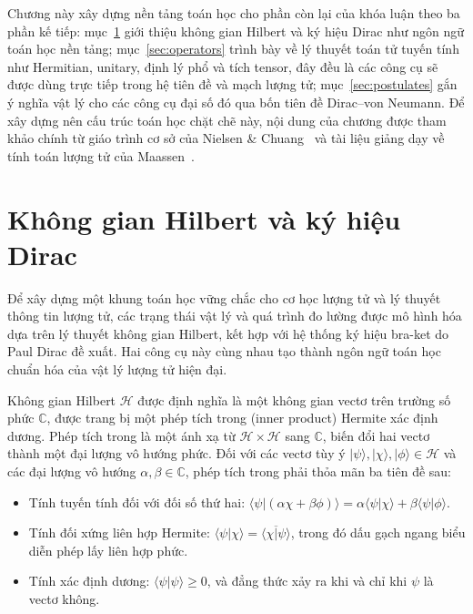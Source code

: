 Chương này xây dựng nền tảng toán học cho phần còn lại của khóa luận theo ba phần kế tiếp: mục~\ref{sec:hilbert} giới thiệu không gian Hilbert và ký hiệu Dirac như ngôn ngữ toán học nền tảng; mục~\ref{sec:operators} trình bày về lý thuyết toán tử tuyến tính như Hermitian, unitary, định lý phổ và tích tensor, đây đều là các công cụ sẽ được dùng trực tiếp trong hệ tiên đề và mạch lượng tử; mục~\ref{sec:postulates} gắn ý nghĩa vật lý cho các công cụ đại số đó qua bốn tiên đề Dirac--von Neumann. Để xây dựng nên cấu trúc toán học chặt chẽ này, nội dung của chương được tham khảo chính từ giáo trình cơ sở của Nielsen \& Chuang~\cite{ref5} và tài liệu giảng dạy về tính toán lượng tử của Maassen~\cite{ref4}.

\section{Không gian Hilbert và ký hiệu Dirac}
\label{sec:hilbert}
Để xây dựng một khung toán học vững chắc cho cơ học lượng tử và lý thuyết thông tin lượng tử, các trạng thái vật lý và quá trình đo lường được mô hình hóa dựa trên lý thuyết không gian Hilbert, kết hợp với hệ thống ký hiệu bra-ket do Paul Dirac đề xuất. Hai công cụ này cùng nhau tạo thành ngôn ngữ toán học chuẩn hóa của vật lý lượng tử hiện đại.

\begin{definition} 
Không gian Hilbert $\mathcal{H}$ được định nghĩa là một không gian vectơ trên trường số phức $\mathbb{C}$, được trang bị một phép tích trong (inner product) Hermite xác định dương. Phép tích trong là một ánh xạ từ $\mathcal{H} \times \mathcal{H}$ sang $\mathbb{C}$, biến đổi hai vectơ thành một đại lượng vô hướng phức. Đối với các vectơ tùy ý $|\psi\rangle, |\chi\rangle, |\phi\rangle \in \mathcal{H}$ và các đại lượng vô hướng $\alpha, \beta \in \mathbb{C}$, phép tích trong phải thỏa mãn ba tiên đề sau:
\begin{itemize}
    \item Tính tuyến tính đối với đối số thứ hai: $\langle \psi | (\alpha \chi + \beta \phi) \rangle = \alpha \langle \psi | \chi \rangle + \beta \langle \psi | \phi \rangle$.
    \item Tính đối xứng liên hợp Hermite: $\langle \psi | \chi \rangle = \overline{\langle \chi | \psi \rangle}$, trong đó dấu gạch ngang biểu diễn phép lấy liên hợp phức.
    \item Tính xác định dương: $\langle \psi | \psi \rangle \ge 0$, và đẳng thức xảy ra khi và chỉ khi $\psi$ là vectơ không.
\end{itemize}
\end{definition}

